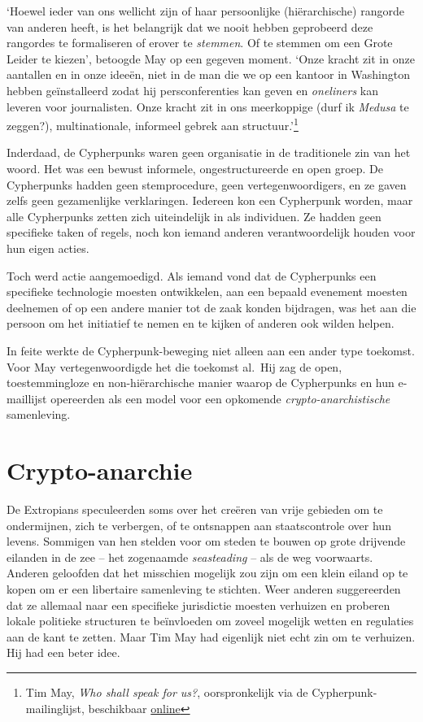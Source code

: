 \documentclass[
  a5paper,
  smalldemyvopaper,11pt,twoside,onecolumn,openright,extrafontsizes,
hidelinks]{memoir}
\begin{document}
`Hoewel ieder van ons wellicht zijn of haar persoonlijke (hiërarchische)
rangorde van anderen heeft, is het belangrijk dat we nooit hebben
geprobeerd deze rangordes te formaliseren of erover te \emph{stemmen}.
Of te stemmen om een Grote Leider te kiezen', betoogde May op een
gegeven moment. `Onze kracht zit in onze aantallen en in onze ideeën,
niet in de man die we op een kantoor in Washington hebben geïnstalleerd
zodat hij persconferenties kan geven en \emph{oneliners} kan leveren
voor journalisten. Onze kracht zit in ons meerkoppige (durf ik
\emph{Medusa} te zeggen?), multinationale, informeel gebrek aan
structuur.'\footnote{Tim May, \emph{Who shall speak for us?},
  oorspronkelijk via de Cypherpunk-mailinglijst, beschikbaar
  \href{https://cypherpunks.venona.com/date/1995/09/msg02189.html}{online}}

Inderdaad, de Cypherpunks waren geen organisatie in de traditionele zin
van het woord. Het was een bewust informele, ongestructureerde en open
groep. De Cypherpunks hadden geen stemprocedure, geen
vertegenwoordigers, en ze gaven zelfs geen gezamenlijke verklaringen.
Iedereen kon een Cypherpunk worden, maar alle Cypherpunks zetten zich
uiteindelijk in als individuen. Ze hadden geen specifieke taken of
regels, noch kon iemand anderen verantwoordelijk houden voor hun eigen
acties.

Toch werd actie aangemoedigd. Als iemand vond dat de Cypherpunks een
specifieke technologie moesten ontwikkelen, aan een bepaald evenement
moesten deelnemen of op een andere manier tot de zaak konden bijdragen,
was het aan die persoon om het initiatief te nemen en te kijken of
anderen ook wilden helpen.

In feite werkte de Cypherpunk-beweging niet alleen aan een ander type
toekomst. Voor May vertegenwoordigde het die toekomst al.~Hij zag de
open, toestemmingloze en non-hiërarchische manier waarop de Cypherpunks
en hun e-maillijst opereerden als een model voor een opkomende
\emph{crypto-anarchistische} samenleving.

\section{Crypto-anarchie}\label{crypto-anarchie}

De Extropians speculeerden soms over het creëren van vrije gebieden om
te ondermijnen, zich te verbergen, of te ontsnappen aan staatscontrole
over hun levens. Sommigen van hen stelden voor om steden te bouwen op
grote drijvende eilanden in de zee -- het zogenaamde \emph{seasteading}
-- als de weg voorwaarts. Anderen geloofden dat het misschien mogelijk
zou zijn om een klein eiland op te kopen om er een libertaire
samenleving te stichten. Weer anderen suggereerden dat ze allemaal naar
een specifieke jurisdictie moesten verhuizen en proberen lokale
politieke structuren te beïnvloeden om zoveel mogelijk wetten en
regulaties aan de kant te zetten. Maar Tim May had eigenlijk niet echt
zin om te verhuizen. Hij had een beter idee.
\end{document}
